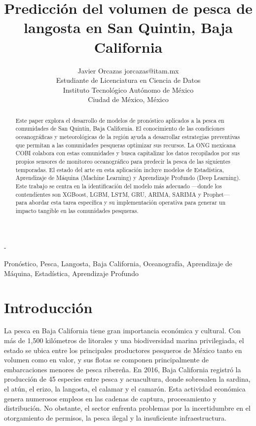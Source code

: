 \documentclass[twoside,11pt]{article}
\begin{document}
\title{Predicción del volumen de pesca de langosta en San Quintin, Baja California}

\author{
\name Javier Orcazas
\email jorcazas@itam.mx \\
\addr Estudiante de Licenciatura en Ciencia de Datos\\
Instituto Tecnológico Autónomo de México\\
Ciudad de México, México
}
\editor -
\maketitle
       
\begin{abstract}%
Este paper explora el desarrollo de modelos de pronóstico aplicados a la pesca en comunidades de San Quintín, Baja California. El conocimiento de las condiciones oceanográficas y meteorológicas de la región ayuda a desarrollar estrategias preventivas que permitan a las comunidades pesqueras optimizar sus recursos. La ONG mexicana COBI colabora con estas comunidades y busca capitalizar los datos recopilados por sus propios sensores de monitoreo oceanográfico para predecir la pesca de las siguientes temporadas.
El estado del arte en esta aplicación incluye modelos de Estadística, Aprendizaje de Máquina (Machine Learning) y Aprendizaje Profundo (Deep Learning). Este trabajo se centra en la identificación del modelo más adecuado —donde los contendientes son XGBoost, LGBM, LSTM, GRU, ARIMA, SARIMA y Prophet— para abordar esta tarea específica y su implementación operativa para generar un impacto tangible en las comunidades pesqueras.
\end{abstract}

\begin{keywords}
  Pronóstico, Pesca, Langosta, Baja California, Oceanografía, Aprendizaje de Máquina, Estadística, Aprendizaje Profundo
\end{keywords}

\section{Introducción}

La pesca en Baja California tiene gran importancia económica y cultural. Con más de 1,500 kilómetros de litorales y una biodiversidad marina privilegiada, el estado se ubica entre los principales productores pesqueros de México tanto en volumen como en valor, y sus flotas se componen principalmente de embarcaciones menores de pesca ribereña. En 2016, Baja California registró la producción de 45 especies entre pesca y acuacultura, donde sobresalen la sardina, el atún, el erizo, la langosta, el calamar y el camarón. Esta actividad económica genera numerosos empleos en las cadenas de captura, procesamiento y distribución. No obstante, el sector enfrenta problemas por la incertidumbre en el otorgamiento de permisos, la pesca ilegal y la insuficiente infraestructura.
\end{document}
